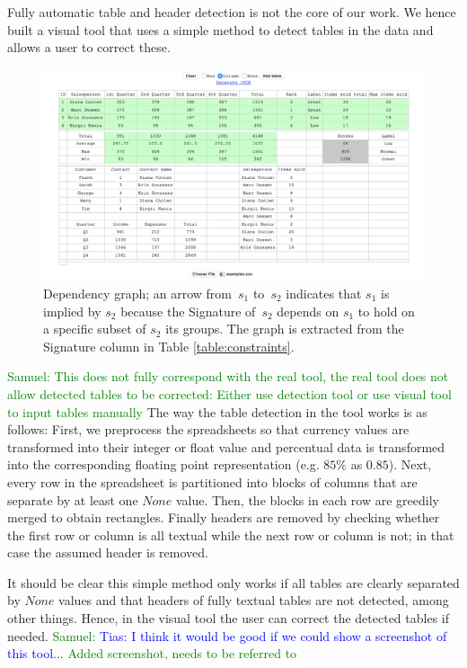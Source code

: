 \documentclass{sig-alternate-05-2015}
\newcommand{\samuel}[1]{\textcolor{green}{{\sc Samuel:} #1}\xspace}
\newcommand{\tias}[1]{\textcolor{blue}{{\sc Tias:} #1}\xspace}
\newcommand{\CSignature}{Signature\xspace}
\begin{document}
Fully automatic table and header detection is not the core of our work. We hence built a visual tool that uses a simple method to detect tables in the data and allows a user to correct these.

\begin{figure}[t]
  \centering
  \includegraphics[width=1\linewidth]{figures/tabletool.png}
  \caption{Dependency graph; an arrow from~$s_1$ to~$s_2$ indicates that $s_1$ is implied by $s_2$ because the \CSignature of~$s_2$ depends on $s_1$ to hold on a specific subset of $s_2$ its groups.
    The graph is extracted from the Signature column in Table \ref{table:constraints}.
  }
  \label{fig:learning_order}
\end{figure}

\samuel{This does not fully correspond with the real tool, the real tool does not allow detected tables to be corrected: Either use detection tool or use visual tool to input tables manually}
The way the table detection in the tool works is as follows:
First, we preprocess the spreadsheets so that currency values are transformed into their integer or float value and percentual data is transformed into the corresponding floating point representation (e.g. $85\%$ as $0.85$).
Next, every row in the spreadsheet is partitioned into blocks of columns that are separate by at least one $None$ value. Then, the blocks in each row are greedily merged to obtain rectangles. Finally headers are removed by checking whether the first row or column is all textual while the next row or column is not; in that case the assumed header is removed.

It should be clear this simple method only works if all tables are clearly separated by $None$ values and that headers of fully textual tables are not detected, among other things. Hence, in the visual tool the user can correct the detected tables if needed. \samuel{\tias{I think it would be good if we could show a screenshot of this tool...} Added screenshot, needs to be referred to}
\end{document}
